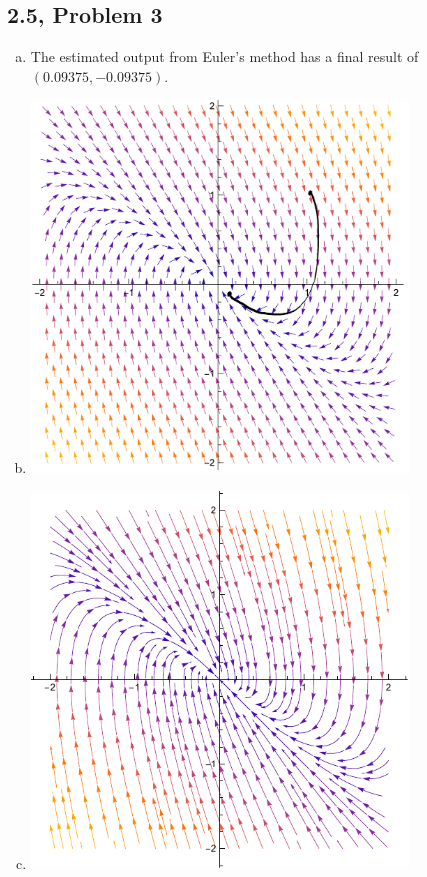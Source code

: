 \documentclass[10pt]{mypackage}
\begin{document}
\subsection{2.5, Problem 3}%
\begin{enumerate}[(a)]
  \item The estimated output from Euler's method has a final result of $\left(0.09375,-0.09375\right)$.
  \item \hfill
    \begin{center}
      \includegraphics[width=10cm]{images/2_5_3b.png}
    \end{center}
  \item \hfill
    \begin{center}
      \includegraphics[width=10cm]{images/2_5_3c.pdf}
    \end{center}
\end{enumerate}
\end{document}
